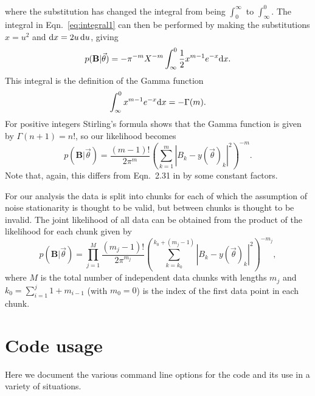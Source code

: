 \documentclass[aps,prd,showpacs,superscriptaddress,twocolumn,preprintnumbers,altaffilletter]{revtex4-1}
\begin{document}
where the substitution has changed the integral from being $\int_0^{\infty}$ to $\int_{\infty}^0$. The
integral in Eqn.~\ref{eq:integral1} can then be performed by making the substitutions $x = u^2$ and ${\rm d}x
= 2u\,{\rm d}u$, giving
\begin{equation}
p(\mathbf{B}|\vec{\theta}) = - \pi^{-m} X^{-m} \int_{\infty}^0 \frac{1}{2} x^{m-1} e^{-x}
{\rm d}x.
\end{equation}
This integral is the definition of the Gamma function
\begin{equation}
 \int_{\infty}^0 x^{m-1} e^{-x} {\rm d}x = -\Gamma(m).
\end{equation}
For positive integers Stirling's formula shows that the Gamma function is given by $\Gamma(n+1) = n!$, so our
likelihood becomes
\begin{equation}\label{eq:complex}
p(\mathbf{B}|\vec{\theta}) = \frac{(m-1)!}{2\pi^m} \left(\sum_{k=1}^m
|B_k-y(\vec{\theta})_k|^2\right)^{-m}.
\end{equation}
Note that, again, this differs from Eqn.~2.31 in \cite{Dupuisthesis} by some constant factors.

For our analysis the data is split into chunks for each of which the assumption of noise stationarity is
thought to be valid, but between chunks is thought to be invalid. The joint likelihood of all data can be
obtained from the product of the likelihood for each chunk given by
\begin{equation}\label{eq:prod}
p(\mathbf{B}|\vec{\theta}) = \prod_{j=1}^M \frac{(m_j-1)!}{2\pi^{m_j}}
\left(\sum_{k=k_0}^{k_0+(m_j-1)} |B_k-y(\vec{\theta})_k|^2\right)^{-m_j},
\end{equation}
where $M$ is the total number of independent data chunks with lengths $m_j$ and $k_0 = \sum_{i=1}^{j}
1+m_{i-1}$ (with $m_0 = 0$) is the index of the first data point in each chunk.

\section{Code usage}

Here we document the various command line options for the code and its use in a variety of situations.


\end{document}
